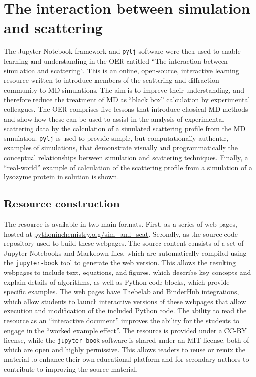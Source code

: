\section{The interaction between simulation and scattering}
\label{sec:sim_and_scat}
The Jupyter Notebook framework and \texttt{pylj} software were then used to enable learning and understanding in the OER entitled ``The interaction between simulation and scattering''.\autocite[available at \href{https://pythoninchemistry.org/sim_and_scat}{pythoninchemistry.org/sim\_and\_scat}]{mccluskey_introduction_2019,mccluskey_pythoninchemistry/sim_and_scat_2019}
This is an online, open-source, interactive learning resource written to introduce members of the scattering and diffraction community to MD simulations.
The aim is to improve their understanding, and therefore reduce the treatment of MD as ``black box'' calculation by experimental colleagues.
The OER comprises five lessons that introduce classical MD methods and show how these can be used to assist in the analysis of experimental scattering data by the calculation of a simulated scattering profile from the MD simulation.
\texttt{pylj} is used to provide simple, but computationally authentic, examples of simulations, that demonstrate visually and programmatically the conceptual relationships between simulation and scattering techniques.
Finally, a ``real-world'' example of calculation of the scattering profile from a simulation of a lysozyme protein in solution is shown.

\subsection{Resource construction}
The resource is available in two main formats.
First, as a series of web pages, hosted at \href{https://pythoninchemistry.org/sim_and_scat}{pythoninchemistry.org/sim\_and\_scat}.
Secondly, as the source-code repository used to build these webpages.\autocite{mccluskey_pythoninchemistry/sim_and_scat_2019}
The source content consists of a set of Jupyter Notebooks and Markdown files, which are automatically compiled using the \texttt{jupyter-book} tool\autocite{lau_jupyter/jupyter-book_2019} to generate the web version.
This allows the resulting webpages to include text, equations, and figures, which describe key concepts and explain details of algorithms, as well as Python code blocks, which provide specific examples.
The web pages have Thebelab and BinderHub integrations,\autocite{ragan-kelley_minrk/thebelab_2019, ragan-kelley_jupyterhub/binderhub_2019, jupyter_binder_2018} which allow students to launch interactive versions of these webpages that allow execution and modification of the included Python code.
The ability to read the resource as an ``interactive document'' improves the ability for the students to engage in the ``worked example effect''.\autocite{tarmizi_guidance_1988}
The resource is provided under a CC-BY license,\autocite{creative_commons_creative_2019} while the \texttt{jupyter-book} software is shared under an MIT license,\autocite{open_source_mit_2019} both of which are open and highly permissive.
This allows readers to reuse or remix the material to enhance their own educational platform and for secondary authors to contribute to improving the source material.

